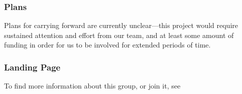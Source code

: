 \subsubsection{Plans}

Plans for carrying forward are currently unclear---this project would require sustained attention and effort from our team, and at least some amount of funding in order for us to be involved for extended periods of time.

\subsubsection{Landing Page}

To find more information about this group, or join it, see 
